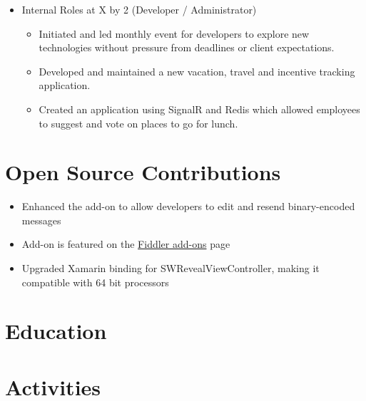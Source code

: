 \documentclass[12pt,letterpaper,sans]{moderncv}
\begin{document}
\begin{itemize}[leftmargin=1.24in]
        \item Internal Roles at X by 2 (Developer / Administrator)
            \begin{itemize}
            	\item Initiated and led monthly event for developers to explore new technologies without pressure from deadlines or client expectations.
                \item Developed and maintained a new vacation, travel and incentive tracking application.
                \item Created an application using SignalR and Redis which allowed employees to suggest and vote on places to go for lunch.
            \end{itemize}
    \end{itemize}
\section{Open Source Contributions}
	\begin{itemize}[leftmargin=1.24in]
		\item Enhanced the add-on to allow developers to edit and resend binary-encoded messages
		\item Add-on is featured on the \href{www.telerik.com/fiddler/add-ons}{Fiddler add-ons} page
	\end{itemize}
	\begin{itemize}[leftmargin=1.24in]
		\item Upgraded Xamarin binding for SWRevealViewController, making it compatible with 64 bit processors
	\end{itemize}


\section{Education}

\section{Activities}
\end{document}
